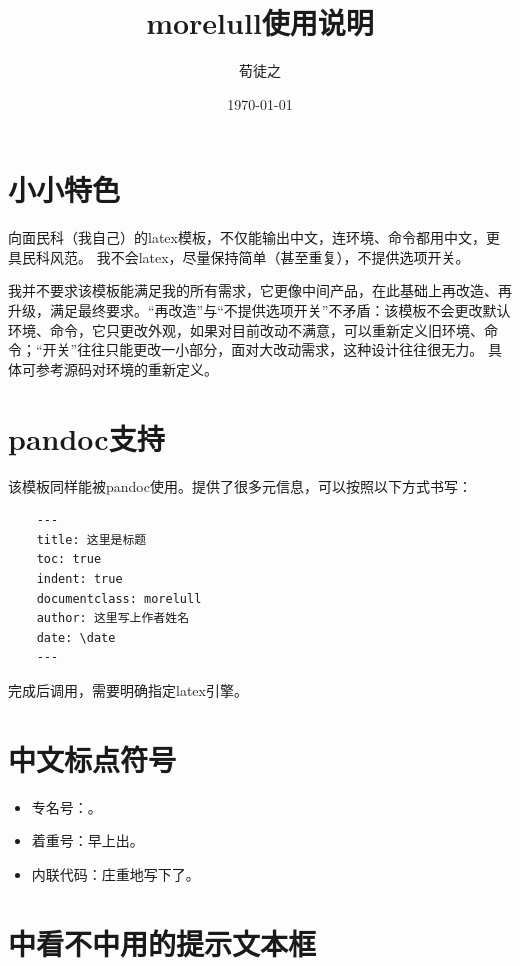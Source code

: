 \documentclass{ctexart}
\title{morelull使用说明}
\author{荀徒之}
\date{\today}
\begin{document}
\maketitle
\tableofcontents

\section{小小特色}
向面民科（我自己）的latex模板，不仅能输出中文，连环境、命令都用中文，更具民科风范。
我不会latex，尽量保持简单（甚至重复），不提供选项开关。

我并不要求该模板能满足我的所有需求，它更像中间产品，在此基础上再改造、再升级，满足最终要求。“再改造”与“不提供选项开关”不矛盾：该模板不会更改默认环境、命令，它只更改外观，如果对目前改动不满意，可以重新定义旧环境、命令；“开关”往往只能更改一小部分，面对大改动需求，这种设计往往很无力。
具体可参考源码对环境的重新定义。

\section{pandoc支持}

该模板同样能被pandoc使用。提供了很多元信息，可以按照以下方式书写：

\begin{lstlisting}
    ---
    title: 这里是标题
    toc: true
    indent: true
    documentclass: morelull
    author: 这里写上作者姓名
    date: \date
    ---
\end{lstlisting}

完成后调用，需要明确指定latex引擎。

\section{中文标点符号}

\begin{itemize}
\item{专名号：。}
\item{着重号：早上出。}
\item{内联代码：庄重地写下了。}
\end{itemize}

\section{中看不中用的提示文本框}
\end{document}
